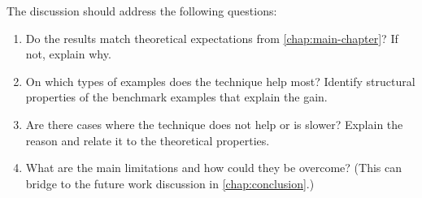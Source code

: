 The discussion should address the following questions:
\begin{enumerate}
    \item Do the results match theoretical expectations from \cref{chap:main-chapter}?
          If not, explain why.
    \item On which types of examples does the technique help most? 
          Identify structural properties of the benchmark examples that explain the gain.
    \item Are there cases where the technique does not help or is slower?
          Explain the reason and relate it to the theoretical properties.
    \item What are the main limitations and how could they be overcome?
          (This can bridge to the future work discussion in \cref{chap:conclusion}.)
\end{enumerate}
